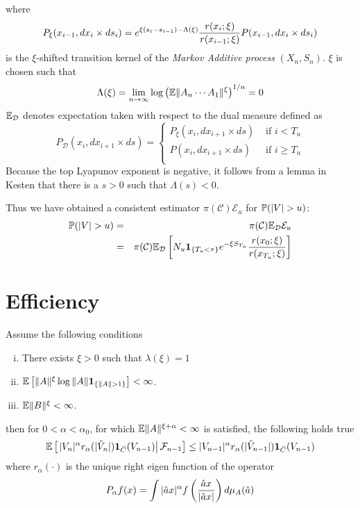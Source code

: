 \documentclass{article}
\begin{document}
where
\[
P_\xi(x_{i-1}, dx_i \times ds_i) = e^{\xi(s_i - s_{i-1}) -
  \Lambda(\xi)} {r(x_i; \xi) \over r(x_{i-1}; \xi)} P(x_{i-1}, dx_i
\times ds_i)
\]
is the $\xi$-shifted transition kernel of the {\it Markov Additive
  process} $(X_n, S_n)$. $\xi$ is chosen such that 
\[
\Lambda(\xi) = \lim_{n \to \infty} \log \left(
\E \|A_n \cdots A_1\|^\xi
\right)^{1/n} = 0
\]
$\E_{\mathcal D}$ denotes expectation taken with respect to the dual
measure defined as
\[
P_{\mathcal D} (x_i, dx_{i+1} \times ds) = \left\{
  \begin{array}{ll}
    P_\xi (x_i, dx_{i+1} \times ds) & \text{ if } i < T_u \\
    P(x_i, dx_{i+1} \times ds) & \text{ if } i \geq T_u \\
  \end{array}
\right.
\]
Because the top Lyapunov exponent is negative, it follows from a lemma
in Kesten \cite{Kesten1973} that there is a $s > 0$ such that
$\Lambda(s) < 0$.

Thus we have obtained a consistent estimator
$\pi(\mathcal C)\mathcal E_u$ for $\P(|V| > u)$:
\begin{eqnarray*}
\P(|V| > u) &=& \pi(\mathcal C) \E_{\mathcal D} \mathcal E_u \\
&=& \pi(\mathcal C) \E_{\mathcal D} \left[
  N_u \1{T_u < \tau} e^{-\xi S_{T_u}} {r(x_0; \xi)
    \over r(x_{T_u}; \xi)}
\right]
\end{eqnarray*}

\section{Efficiency}\label{sec:efficiency}
\begin{lemma}
  Assume the following conditions
  \begin{enumerate}[(i)]
  \item There exists $\xi > 0$ such that $\lambda(\xi) = 1$
  \item $\E\left[
      \|A\|^{\xi} \log\|A\|\1{\|A\| > 1}
      \right] < \infty$.
  \item $\E \|B\|^{\xi} < \infty$.
  \end{enumerate}
  then for $0 < \alpha < \alpha_0$, for which $\E\|A\|^{\xi + \alpha} <
  \infty$ is satisfied, the following holds true
  \begin{equation}
    \label{eq:drift}
    \E \left[\left.
        |V_n|^\alpha r_{\alpha}(|\tilde V_n|) \I{\bar C}(V_{n-1}) \right|
      \mathcal F_{n-1} \right] \leq |V_{n-1}|^\alpha r_{\alpha}(|\tilde
    V_{n-1}|) \I{\bar C}(V_{n-1})
  \end{equation}
  where $r_{\alpha}(\cdot)$ is the unique right eigen function of the
  operator
  \[
  P_{\alpha} f(x) = \int |\hat a x|^\alpha f\left(
    {\hat a x \over |\hat a x|}
  \right) d\mu_A(\hat a)
  \]
\end{lemma}
\end{document}
